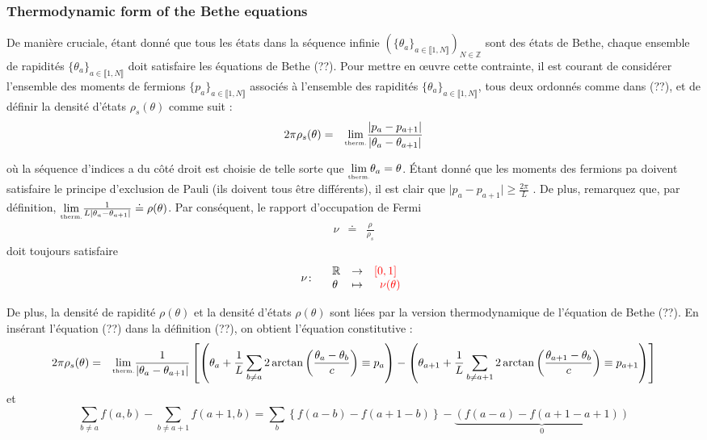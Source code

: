 \subsubsection{Thermodynamic form of the Bethe equations}

De manière cruciale, étant donné que tous les états dans la séquence infinie $(\{\theta_a\}_{ a \in \llbracket 1 , N \rrbracket} )_{ N \in \mathbb{Z}}$ sont des états de Bethe, chaque ensemble de rapidités $\{\theta_a\}_{ a \in \llbracket 1 , N \rrbracket}$ doit satisfaire les équations de Bethe (??). Pour mettre en œuvre cette contrainte, il est courant de considérer l'ensemble des moments de fermions $\{p_a\}_{ a \in \llbracket 1 , N \rrbracket}$ associés à l'ensemble des rapidités $\{\theta_a\}_{ a \in \llbracket 1 , N \rrbracket}$, tous deux ordonnés comme dans (??), et de définir la densité d'états $\rho_s(\theta )$ comme suit :
\begin{eqnarray}
	2\pi \rho_s ( \theta ) & = & \underset{\tiny \mbox{therm.}}{\lim}\frac{ \vert p_a - p_{a+1} \vert}{ \vert \theta_a - \theta_{a+1} \vert }	
\end{eqnarray}

où la séquence d'indices a du côté droit est choisie de telle sorte que $\underset{\tiny \mbox{therm.}}{\lim} \theta_a  = \theta $. Étant donné que les moments des fermions pa doivent satisfaire le principe d'exclusion de Pauli (ils doivent tous être différents), il est clair que $\vert p_a - p_{a+1}\vert \geq  \frac{2 \pi}{L}$ . De plus, remarquez que, par définition, $\underset{\tiny \mbox{therm.}}{\lim} \frac{1}{L \vert \theta_a - \theta_{a+1} \vert } \doteq  \rho ( \theta ) $. Par conséquent, le rapport d'occupation de Fermi
\begin{eqnarray}
	\nu & \doteq & \frac{ \rho }{ \rho_s } 	
\end{eqnarray}
doit toujours satisfaire
\begin{eqnarray}
	\nu & \colon & \begin{array}{lcr} \mathbb{R} & \rightarrow & {\color{red} [ 0 , 1 ]}  \\ \theta & \mapsto &  {\color{red} \nu ( \theta )}  \end{array} 	
\end{eqnarray}

De plus, la densité de rapidité $\rho(\theta ) $ et la densité d'états $\rho(\theta ) $ sont liées par la version thermodynamique de l'équation de Bethe (??). En insérant l'équation (??) dans la définition (??), on obtient l'équation constitutive :
{\tiny 
\begin{eqnarray}
	2\pi \rho_s ( \theta ) & = & \underset{\tiny \mbox{therm.}}{\lim} \frac{1}{ \vert \theta_a - \theta_{a+1} \vert } \left [ \left ( \theta_a + \frac{1}{L} \sum_{b \neq a} 2 \arctan \left( \frac{\theta_a - \theta_b }{c} \right ) \equiv p_a \right ) -  \left ( \theta_{a+1} + \frac{1}{L} \sum_{b \neq a + 1 } 2 \arctan \left( \frac{\theta_{a+1}  - \theta_b }{c} \right ) \equiv p_{a+1} \right ) \right ] 		
\end{eqnarray}
}
et $$ \sum_{ b \neq a } f ( a , b ) - \sum_{ b \neq a + 1  }  f ( a + 1  , b ) = \sum_{ b }  \left \{  f ( a - b ) -  f ( a + 1  - b )  \right \} - \underbrace{(f ( a  - a ) - f ( a + 1  -  a + 1 ) )}_{0} $$

